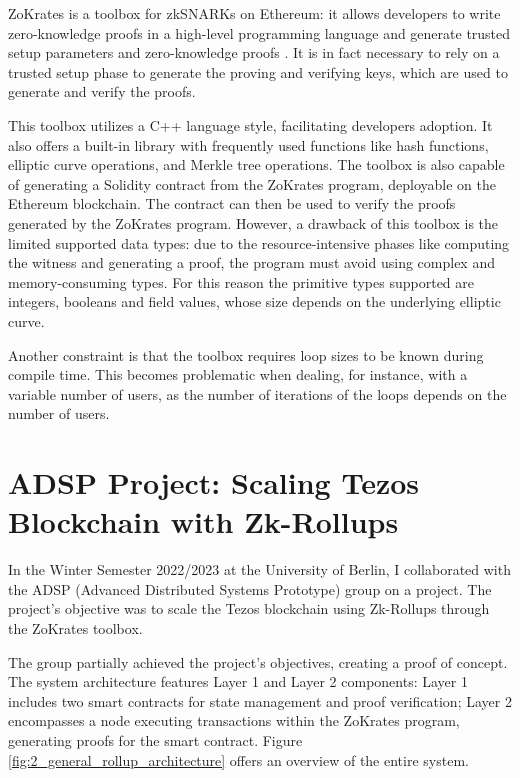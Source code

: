 ZoKrates is a toolbox for zkSNARKs on Ethereum: it allows developers to write zero-knowledge proofs in a high-level programming language and generate trusted setup parameters and zero-knowledge proofs \cite{eberhardt_ZoKrates_2018}. It is in fact necessary to rely on a trusted setup phase to generate the proving and verifying keys, which are used to generate and verify the proofs.

This toolbox utilizes a C++ language style, facilitating developers adoption. It also offers a built-in library with frequently used functions like hash functions, elliptic curve operations, and Merkle tree operations. The toolbox is also capable of generating a Solidity contract from the ZoKrates program, deployable on the Ethereum blockchain. The contract can then be used to verify the proofs generated by the ZoKrates program. However, a drawback of this toolbox is the limited supported data types: due to the resource-intensive phases like computing the witness and generating a proof, the program must avoid using complex and memory-consuming types. For this reason the primitive types supported are integers, booleans and field values, whose size depends on the underlying elliptic curve.

Another constraint is that the toolbox requires loop sizes to be known during compile time. This becomes problematic when dealing, for instance, with a variable number of users, as the number of iterations of the loops depends on the number of users.

\section{ADSP Project: Scaling Tezos Blockchain with Zk-Rollups \label{sec:2_adspProject}}

In the Winter Semester 2022/2023 at the University of Berlin, I collaborated with the ADSP (Advanced Distributed Systems Prototype) group on a project. The project's objective was to scale the Tezos blockchain using Zk-Rollups through the ZoKrates toolbox.

The group partially achieved the project's objectives, creating a proof of concept. The system architecture features Layer 1 and Layer 2 components: Layer 1 includes two smart contracts for state management and proof verification; Layer 2 encompasses a node executing transactions within the ZoKrates program, generating proofs for the smart contract. Figure \ref{fig:2_general_rollup_architecture} offers an overview of the entire system.

